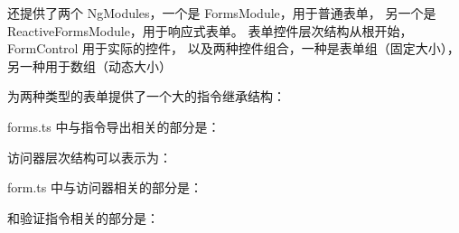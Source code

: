 还提供了两个 NgModules，一个是 FormsModule，用于普通表单，
另一个是 ReactiveFormsModule，用于响应式表单。
表单控件层次结构从根开始，FormControl 用于实际的控件，
以及两种控件组合，一种是表单组（固定大小），
另一种用于数组（动态大小）


为两种类型的表单提供了一个大的指令继承结构：



forms.ts 中与指令导出相关的部分是：




访问器层次结构可以表示为：



form.ts 中与访问器相关的部分是：




和验证指令相关的部分是：



